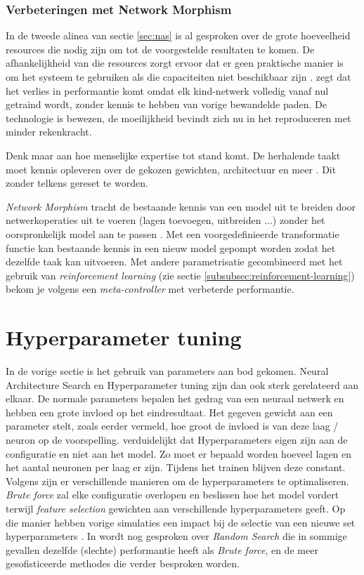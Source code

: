 \subsubsection{Verbeteringen met Network Morphism}
\label{subsubsec:network-morphism}

In de tweede alinea van sectie \ref{sec:nas} is al gesproken over de grote hoeveelheid resources die nodig zijn om tot de voorgestelde resultaten te komen. De afhankelijkheid van die resources zorgt ervoor dat er geen praktische manier is om het systeem te gebruiken als die capaciteiten niet beschikbaar zijn \autocite{Cai2017}. \textcite{Cai2017} zegt dat het verlies in performantie komt omdat elk kind-netwerk volledig vanaf nul getraind wordt, zonder kennis te hebben van vorige bewandelde paden. De technologie is bewezen, de moeilijkheid bevindt zich nu in het reproduceren met minder rekenkracht.

Denk maar aan hoe menselijke expertise tot stand komt. De herhalende taakt moet kennis opleveren over de gekozen gewichten, architectuur en meer \autocite{Chen2016}. Dit zonder telkens gereset te worden.

\textit{Network Morphism} tracht de bestaande kennis van een model uit te breiden door netwerkoperaties uit te voeren (lagen toevoegen, uitbreiden ...) zonder het oorspronkelijk model aan te passen \autocite{Cai2017}. Met een voorgedefinieerde transformatie functie kan bestaande kennis in een nieuw model gepompt worden zodat het dezelfde taak kan uitvoeren. Met andere parametrisatie gecombineerd met het gebruik van \textit{reinforcement learning} (zie sectie \ref{subsubsec:reinforcement-learning}) bekom je volgens \textcite{Cai2017} een \textit{meta-controller} met verbeterde performantie.

\section{Hyperparameter tuning}
\label{sec:hyperparameter-tuning}

In de vorige sectie is het gebruik van parameters aan bod gekomen. Neural Architecture Search en Hyperparameter tuning zijn dan ook sterk gerelateerd aan elkaar. De normale parameters bepalen het gedrag van een neuraal netwerk en hebben een grote invloed op het eindresultaat. Het gegeven gewicht aan een parameter stelt, zoals eerder vermeld, hoe groot de invloed is van deze laag / neuron op de voorspelling. \textcite{GoogleHT2020} verduidelijkt dat Hyperparameters eigen zijn aan de configuratie en niet aan het model. Zo moet er bepaald worden hoeveel lagen en het aantal neuronen per laag er zijn. Tijdens het trainen blijven deze constant. Volgens \textcite{Brust2019} zijn er verschillende manieren om de hyperparameters te optimaliseren. \textit{Brute force} zal elke configuratie overlopen en beslissen hoe het model vordert terwijl \textit{feature selection} gewichten aan verschillende hyperparameters geeft. Op die manier hebben vorige simulaties een impact bij de selectie van een nieuwe set hyperparameters \autocite{Claesen2015}. In \textcite{Bergstra2011} wordt nog gesproken over \textit{Random Search} die in sommige gevallen dezelfde (slechte) performantie heeft als \textit{Brute force}, en de meer gesofisticeerde methodes die verder besproken worden. 

